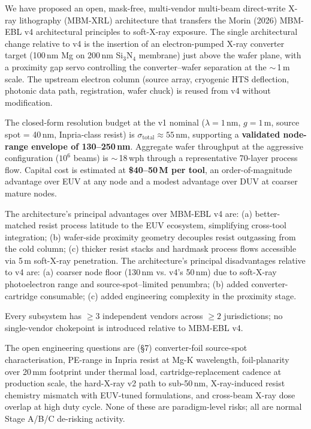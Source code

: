 \documentclass[11pt,letterpaper]{article}
\begin{document}
We have proposed an open, mask-free, multi-vendor multi-beam direct-write X-ray lithography (MBM-XRL) architecture that transfers the Morin (2026) MBM-EBL v4 architectural principles to soft-X-ray exposure. The single architectural change relative to v4 is the insertion of an electron-pumped X-ray converter target (100\,nm Mg on 200\,nm Si$_3$N$_4$ membrane) just above the wafer plane, with a proximity gap servo controlling the converter--wafer separation at the $\sim$\,1\,\textmu m scale. The upstream electron column (source array, cryogenic HTS deflection, photonic data path, registration, wafer chuck) is reused from v4 without modification.

The closed-form resolution budget at the v1 nominal ($\lambda = 1$\,nm, $g = 1$\,\textmu m, source spot = 40\,nm, Inpria-class resist) is $\sigma_\text{total} \approx 55$\,nm, supporting a \textbf{validated node-range envelope of 130--250\,nm}. Aggregate wafer throughput at the aggressive configuration ($10^6$ beams) is $\sim$\,18\,wph through a representative 70-layer process flow. Capital cost is estimated at \textbf{\$40--50\,M per tool}, an order-of-magnitude advantage over EUV at any node and a modest advantage over DUV at coarser mature nodes.

The architecture's principal advantages over MBM-EBL v4 are: (a) better-matched resist process latitude to the EUV ecosystem, simplifying cross-tool integration; (b) wafer-side proximity geometry decouples resist outgassing from the cold column; (c) thicker resist stacks and hardmask process flows accessible via 5\,\textmu m soft-X-ray penetration. The architecture's principal disadvantages relative to v4 are: (a) coarser node floor (130\,nm vs. v4's 50\,nm) due to soft-X-ray photoelectron range and source-spot--limited penumbra; (b) added converter-cartridge consumable; (c) added engineering complexity in the proximity stage.

Every subsystem has $\geq 3$ independent vendors across $\geq 2$ jurisdictions; no single-vendor chokepoint is introduced relative to MBM-EBL v4.

The open engineering questions are (\S 7) converter-foil source-spot characterisation, PE-range in Inpria resist at Mg-K wavelength, foil-planarity over 20\,mm footprint under thermal load, cartridge-replacement cadence at production scale, the hard-X-ray v2 path to sub-50\,nm, X-ray-induced resist chemistry mismatch with EUV-tuned formulations, and cross-beam X-ray dose overlap at high duty cycle. None of these are paradigm-level risks; all are normal Stage A/B/C de-risking activity.
\end{document}
